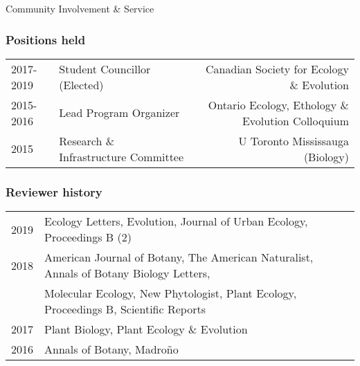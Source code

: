 \documentclass[11pt]{article}
\begin{document}
\noindent \begin{rSection}{Community Involvement \& Service}
\noindent

\subsubsection*{Positions held}
\begin{tabular}{llr}
2017-2019 & Student Councillor (Elected) & Canadian Society for Ecology \& Evolution\\
2015-2016 & Lead Program Organizer & Ontario Ecology, Ethology \& Evolution Colloquium\\
2015 & Research \& Infrastructure Committee & U Toronto Mississauga (Biology)\\
\end{tabular}
\vspace{0.5em}

\subsubsection*{Reviewer history}
\begin{tabular}{llr}

2019 & Ecology Letters, Evolution, Journal of Urban Ecology, Proceedings B (2)\\

2018 & American Journal of Botany, The American Naturalist, Annals of Botany Biology Letters,\\
&  Molecular Ecology, New Phytologist, Plant Ecology, Proceedings B, Scientific Reports\\

2017 & Plant Biology, Plant Ecology \& Evolution\\

2016 & Annals of Botany, Madro{\~n}o

\end{tabular}
\end{rSection}
\end{document}
